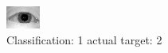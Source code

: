 \begin{figure}[h!]
\begin{center}
\includegraphics[width=0.60\columnwidth]{figures/ID908_class_1_target_2.png}
\end{center}
\caption{ Classification: 1 actual target: 2}
\label{fig:ID908_class_1_target_2}
\end{figure}
